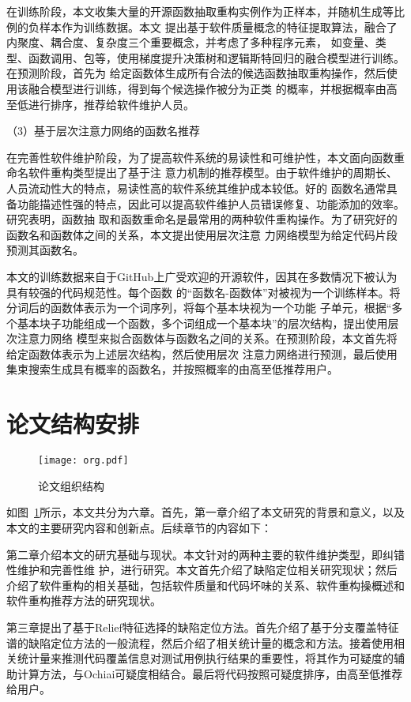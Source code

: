 在训练阶段，本文收集大量的开源函数抽取重构实例作为正样本，并随机生成等比例的负样本作为训练数据。本文
提出基于软件质量概念的特征提取算法，融合了内聚度、耦合度、复杂度三个重要概念，并考虑了多种程序元素，
如变量、类型、函数调用、包等，使用梯度提升决策树和逻辑斯特回归的融合模型进行训练。在预测阶段，首先为
给定函数体生成所有合法的候选函数抽取重构操作，然后使用该融合模型进行训练，得到每个候选操作被分为正类
的概率，并根据概率由高至低进行排序，推荐给软件维护人员。

（3）基于层次注意力网络的函数名推荐

在完善性软件维护阶段，为了提高软件系统的易读性和可维护性，本文面向函数重命名软件重构类型提出了基于注
意力机制的推荐模型。由于软件维护的周期长、人员流动性大的特点，易读性高的软件系统其维护成本较低。好的
函数名通常具备功能描述性强的特点，因此可以提高软件维护人员错误修复、功能添加的效率。研究表明，函数抽
取和函数重命名是最常用的两种软件重构操作。为了研究好的函数名和函数体之间的关系，本文提出使用层次注意
力网络模型为给定代码片段预测其函数名。

本文的训练数据来自于GitHub上广受欢迎的开源软件，因其在多数情况下被认为具有较强的代码规范性。每个函数
的``函数名-函数体''对被视为一个训练样本。将分词后的函数体表示为一个词序列，将每个基本块视为一个功能
子单元，根据``多个基本块子功能组成一个函数，多个词组成一个基本块''的层次结构，提出使用层次注意力网络
模型来拟合函数体与函数名之间的关系。在预测阶段，本文首先将给定函数体表示为上述层次结构，然后使用层次
注意力网络进行预测，最后使用集束搜索生成具有概率的函数名，并按照概率的由高至低推荐用户。

\section{论文结构安排}
\begin{figure}[htp]
  \centering
  \texttt{[image: org.pdf]}
  \caption{论文组织结构}
  \label{fig:org}
\end{figure}

如图~\ref{fig:org}所示，本文共分为六章。首先，第一章介绍了本文研究的背景和意义，以及本文的主要研究内容和创新点。后续章节的内容如下：  

第二章介绍本文的研宄基础与现状。本文针对的两种主要的软件维护类型，即纠错性维护和完善性维
护，进行研究。本文首先介绍了缺陷定位相关研究现状；然后介绍了软件重构的相关基础，包括软件质量和代码坏味的关系、软件重构操概述和软件重构推荐方法的研究现状。

第三章提出了基于Relief特征选择的缺陷定位方法。首先介绍了基于分支覆盖特征谱的缺陷定位方法的一般流程，然后介绍了相关统计量的概念和方法。接着使用相关统计量来推测代码覆盖信息对测试用例执行结果的重要性，将其作为可疑度的辅助计算方法，与Ochiai可疑度相结合。最后将代码按照可疑度排序，由高至低推荐给用户。

